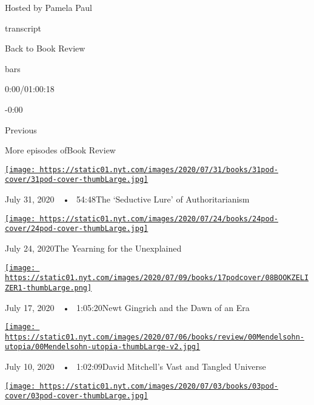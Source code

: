 Hosted by Pamela Paul

transcript

Back to Book Review

bars

0:00/01:00:18

-0:00

Previous

More episodes ofBook Review

\href{https://www.nytimes.com/2020/07/31/books/review/podcast-twilight-democracy-anne-applebaum-eat-buddha-barbara-demick.html?action=click\&module=audio-series-bar\&region=header\&pgtype=Article}{\texttt{[image: https://static01.nyt.com/images/2020/07/31/books/31pod-cover/31pod-cover-thumbLarge.jpg]}}

July 31, 2020~~•~ 54:48The `Seductive Lure' of Authoritarianism

\href{https://www.nytimes.com/2020/07/24/books/review/podcast-colin-dickey-unexplained-miles-harvey-king-of-confidence.html?action=click\&module=audio-series-bar\&region=header\&pgtype=Article}{\texttt{[image: https://static01.nyt.com/images/2020/07/24/books/24pod-cover/24pod-cover-thumbLarge.jpg]}}

July 24, 2020The Yearning for the Unexplained

\href{https://www.nytimes.com/2020/07/17/books/review/podcast-julian-zelizer-burning-down-house-newt-gingrich-notes-silencing-lacy-crawford.html?action=click\&module=audio-series-bar\&region=header\&pgtype=Article}{\texttt{[image: https://static01.nyt.com/images/2020/07/09/books/17podcover/08BOOKZELIZER1-thumbLarge.png]}}

July 17, 2020~~•~ 1:05:20Newt Gingrich and the Dawn of an Era

\href{https://www.nytimes.com/2020/07/10/books/review/david-mitchell-utopia-avenue-daniel-mendelsohn-biggest-bluff-poker-maria-konnikova.html?action=click\&module=audio-series-bar\&region=header\&pgtype=Article}{\texttt{[image: https://static01.nyt.com/images/2020/07/06/books/review/00Mendelsohn-utopia/00Mendelsohn-utopia-thumbLarge-v2.jpg]}}

July 10, 2020~~•~ 1:02:09David Mitchell's Vast and Tangled Universe

\href{https://www.nytimes.com/2020/07/03/books/review/podcast-jules-feiffer-smart-george-steve-inskeep-imperfect-union.html?action=click\&module=audio-series-bar\&region=header\&pgtype=Article}{\texttt{[image: https://static01.nyt.com/images/2020/07/03/books/03pod-cover/03pod-cover-thumbLarge.jpg]}}

